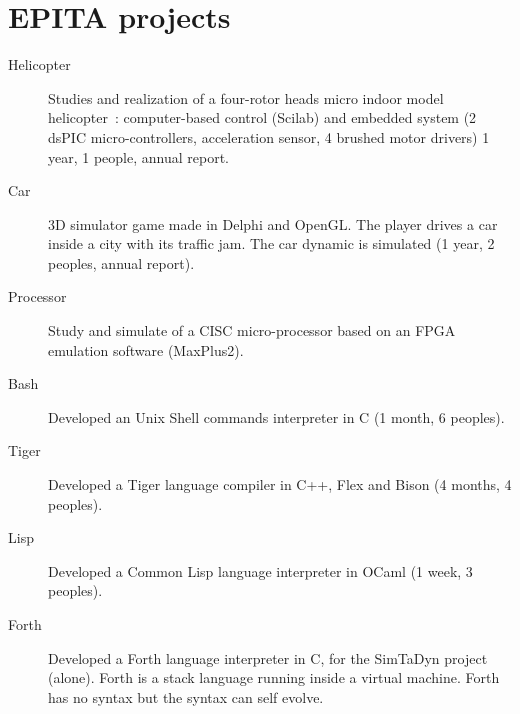 \documentclass{crcv}
\begin{document}
\section{\textcolor{fortitle}{EPITA} projects}

\begin{description}
\item[\textcolor{fortitle}{Helicopter}] Studies and realization of a
  four-rotor heads micro indoor model helicopter~: computer-based
  control (Scilab) and embedded system (2 dsPIC micro-controllers,
  acceleration sensor, 4 brushed motor drivers) 1 year, 1 people,
  annual report.
\end{description}

\begin{description}
\item[\textcolor{fortitle}{Car}] 3D simulator game made in Delphi and
  OpenGL. The player drives a car inside a city with its traffic
  jam. The car dynamic is simulated (1 year, 2 peoples, annual
  report).
\end{description}

\begin{description}
\item[\textcolor{fortitle}{Processor}] Study and simulate of a CISC
  micro-processor based on an FPGA emulation software (MaxPlus2).
\end{description}

\begin{description}
\item[\textcolor{fortitle}{Bash}] Developed an Unix Shell commands
  interpreter in C (1 month, 6 peoples).
\end{description}

\begin{description}
\item[\textcolor{fortitle}{Tiger}] Developed a Tiger language compiler
  in C++, Flex and Bison (4 months, 4 peoples).
\end{description}

\begin{description}
\item[\textcolor{fortitle}{Lisp}] Developed a Common Lisp language
  interpreter in OCaml (1 week, 3 peoples).
\end{description}

\begin{description}
\item[\textcolor{fortitle}{Forth}] Developed a Forth language
  interpreter in C, for the SimTaDyn project (alone). Forth is a stack
  language running inside a virtual machine. Forth has no syntax but
  the syntax can self evolve.
\end{description}
\end{document}
